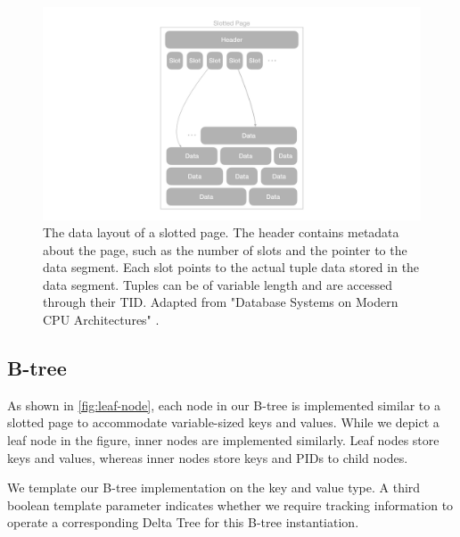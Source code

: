 \begin{figure}[htbp]
  \centering
  \includegraphics[width=1\textwidth]{figures/slotted_page.pdf}
  \caption{The data layout of a slotted page. The header contains metadata about the page, such as the number of slots and the pointer to the data segment. Each slot points to the actual tuple data stored in the data segment. Tuples can be of variable length and are accessed through their \ac{TID}. Adapted from "Database Systems on Modern CPU Architectures" \autocite{mdbs2024slides}.}
  \label{fig:slotted-page}
\end{figure}

\subsection*{B-tree}

As shown in \autoref{fig:leaf-node}, each node in our B-tree is implemented similar to a slotted page to accommodate variable-sized keys and values.
While we depict a leaf node in the figure, inner nodes are implemented similarly.
Leaf nodes store keys and values, whereas inner nodes store keys and \ac{PID}s to child nodes.

We template our B-tree implementation on the key and value type.
A third boolean template parameter indicates whether we require tracking information to operate a corresponding Delta Tree for this B-tree instantiation.

